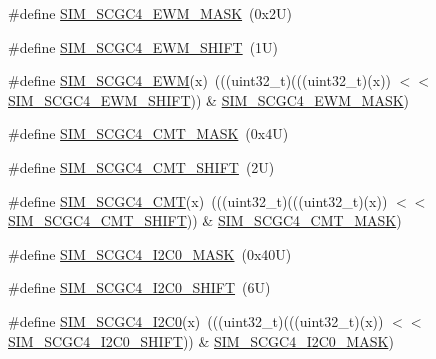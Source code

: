 \begin{DoxyCompactItemize}
\item 
\#define \mbox{\hyperlink{group___s_i_m___register___masks_ga374818f52beee72a9bafcb9efd573dbb}{S\+I\+M\+\_\+\+S\+C\+G\+C4\+\_\+\+E\+W\+M\+\_\+\+M\+A\+SK}}~(0x2\+U)
\item 
\#define \mbox{\hyperlink{group___s_i_m___register___masks_gabb62a44b4428fe9b594449f256278785}{S\+I\+M\+\_\+\+S\+C\+G\+C4\+\_\+\+E\+W\+M\+\_\+\+S\+H\+I\+FT}}~(1\+U)
\item 
\#define \mbox{\hyperlink{group___s_i_m___register___masks_gabee8a137eb82ded937acec91755333ca}{S\+I\+M\+\_\+\+S\+C\+G\+C4\+\_\+\+E\+WM}}(x)~(((uint32\+\_\+t)(((uint32\+\_\+t)(x)) $<$$<$ \mbox{\hyperlink{group___s_i_m___register___masks_gabb62a44b4428fe9b594449f256278785}{S\+I\+M\+\_\+\+S\+C\+G\+C4\+\_\+\+E\+W\+M\+\_\+\+S\+H\+I\+FT}})) \& \mbox{\hyperlink{group___s_i_m___register___masks_ga374818f52beee72a9bafcb9efd573dbb}{S\+I\+M\+\_\+\+S\+C\+G\+C4\+\_\+\+E\+W\+M\+\_\+\+M\+A\+SK}})
\item 
\#define \mbox{\hyperlink{group___s_i_m___register___masks_ga9511253ca2efb3add3f216b07a2af5f2}{S\+I\+M\+\_\+\+S\+C\+G\+C4\+\_\+\+C\+M\+T\+\_\+\+M\+A\+SK}}~(0x4\+U)
\item 
\#define \mbox{\hyperlink{group___s_i_m___register___masks_ga86a5e7e5d0367e60bf1cccefec02f6ec}{S\+I\+M\+\_\+\+S\+C\+G\+C4\+\_\+\+C\+M\+T\+\_\+\+S\+H\+I\+FT}}~(2\+U)
\item 
\#define \mbox{\hyperlink{group___s_i_m___register___masks_ga3315f886e39bcffb98b523c321e3cf14}{S\+I\+M\+\_\+\+S\+C\+G\+C4\+\_\+\+C\+MT}}(x)~(((uint32\+\_\+t)(((uint32\+\_\+t)(x)) $<$$<$ \mbox{\hyperlink{group___s_i_m___register___masks_ga86a5e7e5d0367e60bf1cccefec02f6ec}{S\+I\+M\+\_\+\+S\+C\+G\+C4\+\_\+\+C\+M\+T\+\_\+\+S\+H\+I\+FT}})) \& \mbox{\hyperlink{group___s_i_m___register___masks_ga9511253ca2efb3add3f216b07a2af5f2}{S\+I\+M\+\_\+\+S\+C\+G\+C4\+\_\+\+C\+M\+T\+\_\+\+M\+A\+SK}})
\item 
\#define \mbox{\hyperlink{group___s_i_m___register___masks_ga55fc2bdfb36e61b4771015749307c480}{S\+I\+M\+\_\+\+S\+C\+G\+C4\+\_\+\+I2\+C0\+\_\+\+M\+A\+SK}}~(0x40\+U)
\item 
\#define \mbox{\hyperlink{group___s_i_m___register___masks_ga50185bca8ae97e6b0b0a70541757680b}{S\+I\+M\+\_\+\+S\+C\+G\+C4\+\_\+\+I2\+C0\+\_\+\+S\+H\+I\+FT}}~(6\+U)
\item 
\#define \mbox{\hyperlink{group___s_i_m___register___masks_ga4922352ee7ec444127df95440453118e}{S\+I\+M\+\_\+\+S\+C\+G\+C4\+\_\+\+I2\+C0}}(x)~(((uint32\+\_\+t)(((uint32\+\_\+t)(x)) $<$$<$ \mbox{\hyperlink{group___s_i_m___register___masks_ga50185bca8ae97e6b0b0a70541757680b}{S\+I\+M\+\_\+\+S\+C\+G\+C4\+\_\+\+I2\+C0\+\_\+\+S\+H\+I\+FT}})) \& \mbox{\hyperlink{group___s_i_m___register___masks_ga55fc2bdfb36e61b4771015749307c480}{S\+I\+M\+\_\+\+S\+C\+G\+C4\+\_\+\+I2\+C0\+\_\+\+M\+A\+SK}})
$$
\end{DoxyCompactItemize}
